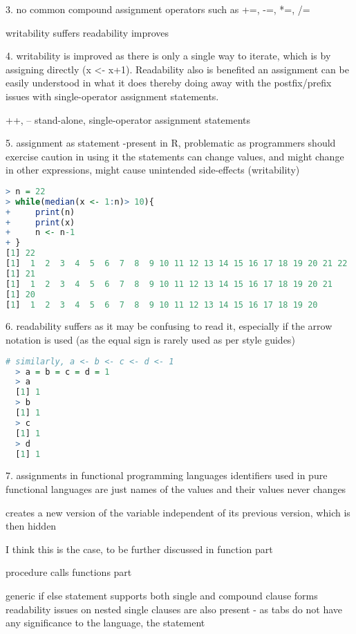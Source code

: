 \documentclass[12pt]{article}
\begin{document}
3.
no common compound assignment operators such as +=, -=, *=, /=

writability suffers
readability improves

4.
writability is improved as there is only a single way to iterate, which is by assigning directly (x <- x+1). Readability also is benefited an assignment can be easily understood in what it does thereby doing away with the postfix/prefix issues with single-operator assignment statements.

++, -- stand-alone, single-operator assignment statements

5. assignment as statement
-present in R, problematic as programmers should exercise caution in using it the statements can change values, and might change in other expressions, might cause unintended side-effects (writability)

\begin{lstlisting}[language=R]
> n = 22
> while(median(x <- 1:n)> 10){
+     print(n)
+     print(x)
+     n <- n-1
+ }
[1] 22
[1]  1  2  3  4  5  6  7  8  9 10 11 12 13 14 15 16 17 18 19 20 21 22
[1] 21
[1]  1  2  3  4  5  6  7  8  9 10 11 12 13 14 15 16 17 18 19 20 21
[1] 20
[1]  1  2  3  4  5  6  7  8  9 10 11 12 13 14 15 16 17 18 19 20
\end{lstlisting}

6.
readability suffers as it may be confusing to read it, especially if the arrow notation is used (as the equal sign is rarely used as per style guides)

\begin{lstlisting}[language=R]
  # similarly, a <- b <- c <- d <- 1
  > a = b = c = d = 1
  > a
  [1] 1
  > b
  [1] 1
  > c
  [1] 1
  > d
  [1] 1
\end{lstlisting}

7. assignments in functional programming languages
identifiers used in pure functional languages are just names of the values and their values never changes

creates a new version of the variable independent of its previous version, which is then hidden

I think this is the case, to be further discussed in function part

procedure calls
 functions part


generic if else statement
supports both single and compound clause forms
readability issues on nested single clauses are also present - as tabs do not have any significance to the language, the statement
\end{document}

